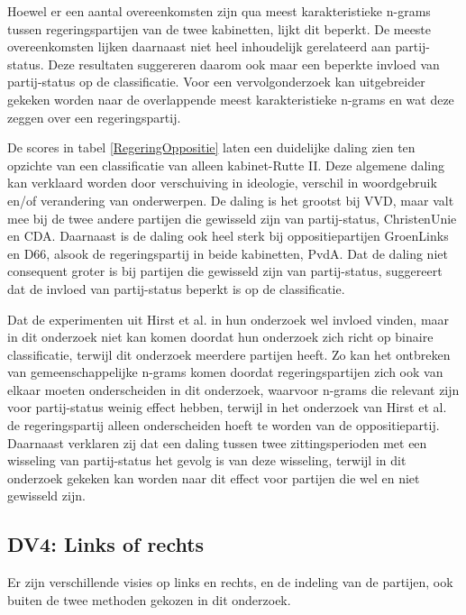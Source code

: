 Hoewel er een aantal overeenkomsten zijn qua meest karakteristieke n-grams tussen regeringspartijen van de twee kabinetten, lijkt dit beperkt. De meeste overeenkomsten lijken daarnaast niet heel inhoudelijk gerelateerd aan partij-status. Deze resultaten suggereren daarom ook maar een beperkte invloed van partij-status op de classificatie. Voor een vervolgonderzoek kan uitgebreider gekeken worden naar de overlappende meest karakteristieke n-grams en wat deze zeggen over een regeringspartij.\par
De scores in tabel \ref{RegeringOppositie} laten een duidelijke daling zien ten opzichte van een classificatie van alleen kabinet-Rutte II. Deze algemene daling kan verklaard worden door verschuiving in ideologie, verschil in woordgebruik en/of verandering van onderwerpen. De daling is het grootst bij VVD, maar valt mee bij de twee andere partijen die gewisseld zijn van partij-status, ChristenUnie en CDA. Daarnaast is de daling ook heel sterk bij oppositiepartijen GroenLinks en D66, alsook de regeringspartij in beide kabinetten, PvdA. Dat de daling niet consequent groter is bij partijen die gewisseld zijn van partij-status, suggereert dat de invloed van partij-status beperkt is op de classificatie.\par
Dat de experimenten uit Hirst et al. in hun onderzoek wel invloed vinden, maar in dit onderzoek niet kan komen doordat hun onderzoek zich richt op binaire classificatie, terwijl dit onderzoek meerdere partijen heeft. Zo kan het ontbreken van gemeenschappelijke n-grams komen doordat regeringspartijen zich ook van elkaar moeten onderscheiden in dit onderzoek, waarvoor n-grams die relevant zijn voor partij-status weinig effect hebben, terwijl in het onderzoek van Hirst et al. de regeringspartij alleen onderscheiden hoeft te worden van de oppositiepartij. Daarnaast verklaren zij dat een daling tussen twee zittingsperioden met een wisseling van partij-status het gevolg is van deze wisseling, terwijl in dit onderzoek gekeken kan worden naar dit effect voor partijen die wel en niet gewisseld zijn.\par

\subsection{DV4: Links of rechts}
Er zijn verschillende visies op links en rechts, en de indeling van de partijen, ook buiten de twee methoden gekozen in dit onderzoek.\par

